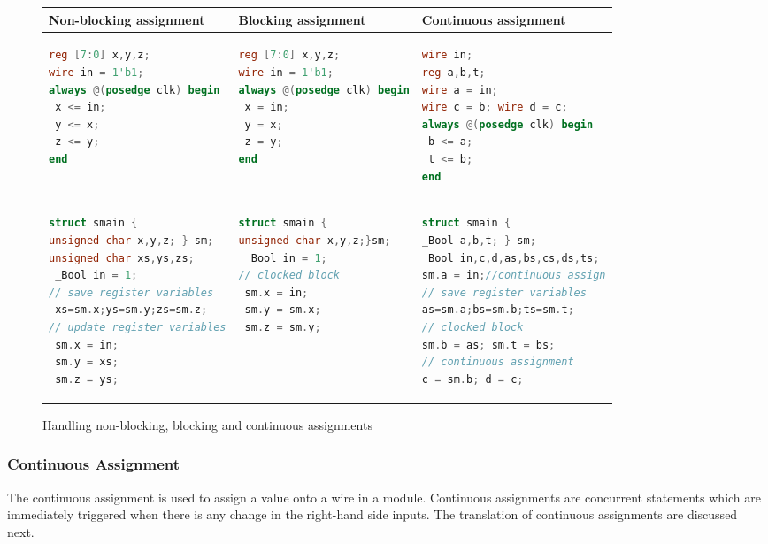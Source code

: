 \begin{figure}[htbp]
\scriptsize
\centering
\begin{tabular}{l|l|l}
\hline
Non-blocking assignment & Blocking assignment & Continuous assignment \\
\hline
\begin{lstlisting}[mathescape=true,language=Verilog]
reg [7:0] x,y,z;
wire in = 1'b1;
always @(posedge clk) begin
 x <= in;
 y <= x;
 z <= y;
end
\end{lstlisting}
&
\begin{lstlisting}[mathescape=true,language=Verilog]
reg [7:0] x,y,z;
wire in = 1'b1;
always @(posedge clk) begin
 x = in;
 y = x;
 z = y;
end
\end{lstlisting}
&
\begin{lstlisting}[mathescape=true,language=Verilog]
wire in;
reg a,b,t;
wire a = in;
wire c = b; wire d = c; 
always @(posedge clk) begin
 b <= a;
 t <= b;
end 
\end{lstlisting}
\\
\hline 
\begin{lstlisting}[mathescape=true,language=C]
struct smain { 
unsigned char x,y,z; } sm;
unsigned char xs,ys,zs;
 _Bool in = 1;
// save register variables
 xs=sm.x;ys=sm.y;zs=sm.z;
// update register variables
 sm.x = in;
 sm.y = xs;
 sm.z = ys;
\end{lstlisting}
&
\begin{lstlisting}[mathescape=true,language=C]
struct smain {
unsigned char x,y,z;}sm;
 _Bool in = 1;
// clocked block
 sm.x = in;
 sm.y = sm.x;
 sm.z = sm.y;
\end{lstlisting}
&
\begin{lstlisting}[mathescape=true,language=C]
struct smain {
_Bool a,b,t; } sm;
_Bool in,c,d,as,bs,cs,ds,ts;
sm.a = in;//continuous assign
// save register variables
as=sm.a;bs=sm.b;ts=sm.t;
// clocked block
sm.b = as; sm.t = bs;
// continuous assignment 
c = sm.b; d = c;
\end{lstlisting}
\\
\hline
\end{tabular}
\caption{Handling non-blocking, blocking and continuous assignments}
\label{figure:block}
\end{figure}
%
\subsubsection{Continuous Assignment}
%
The continuous assignment is used to assign a value onto a 
wire in a module. Continuous assignments are concurrent statements 
which are immediately triggered when there is any change 
in the right-hand side inputs. The translation of continuous 
assignments are discussed next. 


